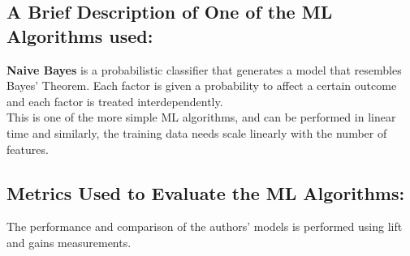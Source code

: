 \documentclass[]{article}
\begin{document}
\subsection*{A Brief Description of One of the ML Algorithms used:}
\textbf{Naive Bayes} is a probabilistic classifier that generates a model that resembles Bayes' Theorem. Each factor is given a probability to affect a certain outcome and each factor is treated interdependently. \\
This is one of the more simple ML algorithms, and can be performed in linear time and similarly, the training data needs scale linearly with the number of features.

\subsection*{Metrics Used to Evaluate the ML Algorithms:}
The performance and comparison of the authors' models is performed using lift and gains measurements.
\end{document}
